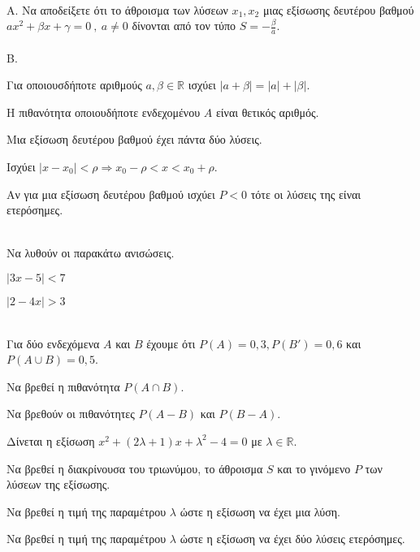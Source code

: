 \documentclass[ektypwsh]{diag-xelatex}
\begin{document}
\begin{thema}
\item \mbox{}\\
Α. Να αποδείξετε ότι το άθροισμα των λύσεων $ x_1,x_2 $ μιας εξίσωσης δευτέρου βαθμού $ ax^2+\beta x+\gamma=0\ ,\ a\neq0 $ δίνονται από τον τύπο $ S=-\frac{\beta}{a} $.\\\\
Β. \swstolathos
\begin{rlist}
\item Για οποιουσδήποτε αριθμούς $ a,\beta\in\mathbb{R} $ ισχύει $ |a+ \beta|=|a|+|\beta| $.
\item Η πιθανότητα οποιουδήποτε ενδεχομένου $ A $ είναι θετικός αριθμός.
\item Μια εξίσωση δευτέρου βαθμού έχει πάντα δύο λύσεις.
\item Ισχύει $ |x-x_0|<\rho\Rightarrow x_0-\rho<x<x_0+\rho $.
\item Αν για μια εξίσωση δευτέρου βαθμού ισχύει $ P<0 $ τότε οι λύσεις της είναι ετερόσημες.
\end{rlist}
\item \mbox{}\\
Να λυθούν οι παρακάτω ανισώσεις.
\begin{multicols}{2}
\begin{rlist}
\item $ |3x-5|<7 $
\item $ |2-4x|>3 $
\end{rlist}
\end{multicols}
\item \mbox{}\\
Για δύο ενδεχόμενα $ A $ και $ B $ έχουμε ότι $ P(A)=0{,}3,P(B')=0{,}6 $ και $ P(A\cup B)=0{,}5 $.
\begin{rlist}
\item Να βρεθεί η πιθανότητα $ P(A\cap B) $.
\item Να βρεθούν οι πιθανότητες $ P(A-B) $ και $ P(B-A) $.
\end{rlist}
\item Δίνεται η εξίσωση $ x^2+(2\lambda+1)x+\lambda^2-4=0 $ με $ \lambda\in\mathbb{R} $.
\begin{rlist}
\item Να βρεθεί η διακρίνουσα του τριωνύμου, το άθροισμα $ S $ και το γινόμενο $ P $ των λύσεων της εξίσωσης.
\item Να βρεθεί η τιμή της παραμέτρου $ \lambda $ ώστε η εξίσωση να έχει μια λύση.
\item Να βρεθεί η τιμή της παραμέτρου $ \lambda $ ώστε η εξίσωση να έχει δύο λύσεις ετερόσημες.
\end{rlist}
\end{thema}
\end{document}
